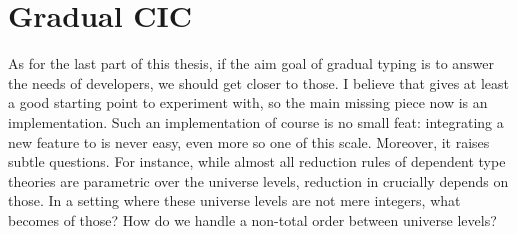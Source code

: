 \section{Gradual CIC}

As for the last part of this thesis, if the aim goal of gradual typing
is to answer the needs of developers, we should get closer to those.
I believe that  gives at least a good starting point to experiment with,
so the main missing piece now is an implementation.
Such an implementation of course is no small feat: integrating a new feature to  is
never easy, even more so one of this scale.
Moreover, it raises subtle questions. For instance, while almost all reduction rules of
dependent type theories are parametric over the universe levels,
reduction in  crucially depends on those.
In a setting where these universe levels are not mere integers,
what becomes of those? How do we handle a non-total order between universe levels?